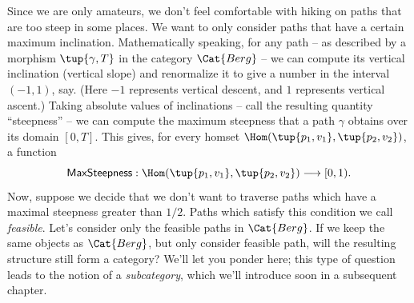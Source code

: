 Since we are only amateurs, we don't feel comfortable with hiking on paths that are too steep in some places. We want to only consider paths that have a certain maximum inclination. Mathematically speaking, for any path -- as described by a morphism $\tup{\gamma, T}$ in the category $\Cat{Berg}$ -- we can compute its vertical inclination (vertical slope) and renormalize it to give a number in the interval $(-1, 1)$, say. (Here $-1$ represents vertical descent, and $1$ represents vertical ascent.) Taking absolute values of inclinations -- call the resulting quantity ``steepness'' -- we can compute the maximum steepness that a path $\gamma$ obtains over its domain $[0,T]$. This gives, for every homset $\Hom(\tup{p_1, v_1}, \tup{p_2, v_2})$, a function
$$
\mathsf{MaxSteepness}: \Hom(\tup{p_1, v_1}, \tup{p_2, v_2}) \longrightarrow [0, 1).
$$
Now, suppose we decide that we don't want to traverse paths which have a maximal steepness greater than $1/2$. Paths which satisfy this condition we call \emph{feasible}. Let's consider only the feasible paths in $\Cat{Berg}$. If we keep the same objects as $\Cat{Berg}$, but only consider feasible path, will the resulting structure still form a category? We'll let you ponder here; this type of question leads to the notion of a \emph{subcategory}, which we'll introduce soon in a subsequent chapter.


%
%
%


